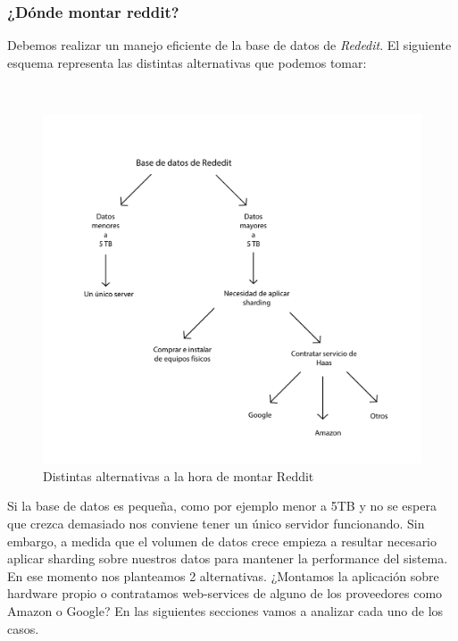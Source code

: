 

\subsubsection{¿Dónde montar reddit?}

Debemos realizar un manejo eficiente de la base de datos de \emph{Rededit}. El siguiente esquema representa las distintas
alternativas que podemos tomar:

~

\begin{figure}[!h]
	\begin{center}
		  \includegraphics[keepaspectratio]{imagenes/im_1.pdf}
		  \caption{Distintas alternativas a la hora de montar Reddit}
		  \label{fig:contra1}
	\end{center}
\end{figure}
\FloatBarrier

Si la base de datos es peque\~na, como por ejemplo menor a 5TB y no se espera que crezca demasiado
nos conviene tener un único servidor funcionando. Sin embargo, a medida que el volumen de datos crece
empieza a resultar necesario aplicar sharding sobre nuestros datos para mantener la performance del sistema. En ese
momento nos planteamos 2 alternativas. ¿Montamos la aplicación sobre hardware propio o contratamos web-services 
de alguno de los proveedores como Amazon o Google? En las siguientes secciones vamos a analizar cada uno de los casos.

